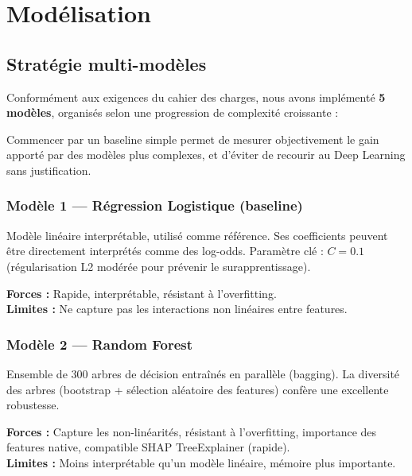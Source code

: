 \documentclass[12pt,a4paper]{report}
\begin{document}
\chapter{Modélisation}

\section{Stratégie multi-modèles}

Conformément aux exigences du cahier des charges, nous avons implémenté \textbf{5 modèles},
organisés selon une progression de complexité croissante :

\begin{infobox}[title=Justification de la progression]
Commencer par un baseline simple permet de mesurer objectivement le gain apporté par
des modèles plus complexes, et d'éviter de recourir au Deep Learning sans justification.
\end{infobox}

\subsection{Modèle 1 — Régression Logistique (baseline)}

Modèle linéaire interprétable, utilisé comme référence. Ses coefficients peuvent être
directement interprétés comme des log-odds. Paramètre clé : $C = 0.1$ (régularisation L2
modérée pour prévenir le surapprentissage).

\textbf{Forces :} Rapide, interprétable, résistant à l'overfitting.\\
\textbf{Limites :} Ne capture pas les interactions non linéaires entre features.

\subsection{Modèle 2 — Random Forest}

Ensemble de 300 arbres de décision entraînés en parallèle (bagging). La diversité des
arbres (bootstrap + sélection aléatoire des features) confère une excellente robustesse.

\textbf{Forces :} Capture les non-linéarités, résistant à l'overfitting, importance des
features native, compatible SHAP TreeExplainer (rapide).\\
\textbf{Limites :} Moins interprétable qu'un modèle linéaire, mémoire plus importante.
\end{document}
